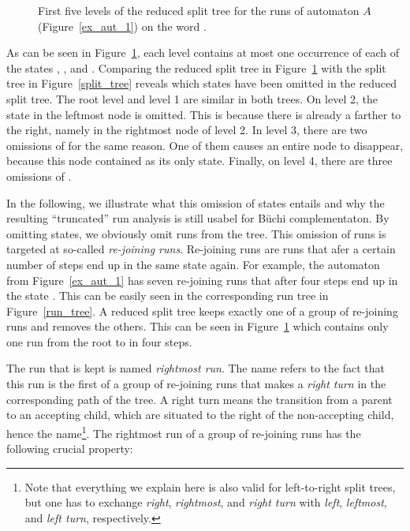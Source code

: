
\begin{figure}[htb]
\centering
\ReducedSplitTreeRightLeft
\caption{First five levels of the reduced split tree for the runs of automaton $A$ (Figure~\ref{ex_aut_1}) on the word \aom.}
\label{reduced_split_tree}
\end{figure}

As can be seen in Figure~\ref{reduced_split_tree}, each level contains at most one occurrence of each of the states , , and . Comparing the reduced split tree in Figure~\ref{reduced_split_tree} with the split tree in Figure~\ref{split_tree} reveals which states have been omitted in the reduced split tree. The root level and level 1 are similar in both trees. On level 2, the state  in the leftmost node is omitted. This is because there is already a  farther to the right, namely in the rightmost node of level 2. In level 3, there are two omissions of  for the same reason. One of them causes an entire node to disappear, because this node contained  as its only state. Finally, on level 4, there are three omissions of .

In the following, we illustrate what this omission of states entails and why the resulting ``truncated'' run analysis is still usabel for Büchi complementaton. By omitting states, we obviously omit runs from the tree. This omission of runs is targeted at so-called \textit{re-joining runs}. Re-joining runs are runs that afer a certain number of steps end up in the same state again. For example, the automaton from Figure~\ref{ex_aut_1} has seven re-joining runs that after four steps end up in the state . This can be easily seen in the corresponding run tree in Figure~\ref{run_tree}. A reduced split tree keeps exactly one of a group of re-joining runs and removes the others. This can be seen in Figure~\ref{reduced_split_tree} which contains only one run from the root to  in four steps.

The run that is kept is named \textit{rightmost run}. The name refers to the fact that this run is the first of a group of re-joining runs that makes a \textit{right turn} in the corresponding path of the tree. A right turn means the transition from a parent to an accepting child, which are situated to the right of the non-accepting child, hence the name\footnote{Note that everything we explain here is also valid for left-to-right split trees, but one has to exchange \textit{right}, \textit{rightmost}, and \textit{right turn} with \textit{left}, \textit{leftmost}, and \textit{left turn}, respectively.}. The rightmost run of a group of re-joining runs has the following crucial property:

